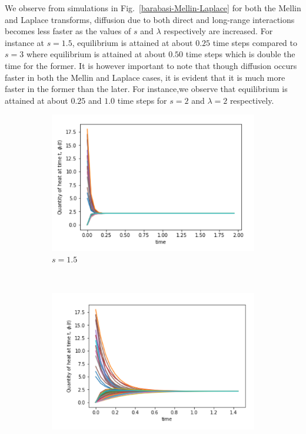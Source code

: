 \documentclass[10pt,a4paper]{article}
\begin{document}
       We observe from simulations in Fig.~\ref{barabasi-Mellin-Laplace} for both the Mellin and Laplace transforms, diffusion due to both direct and long-range interactions becomes less faster as the values of $s$ and $\lambda$ respectively are increased. For instance at $s=1.5$, equilibrium is attained at about $0.25$ time steps compared to $s=3$ where equilibrium is attained at about $0.50$ time steps which is double the time for the former. It is however important to note that though diffusion occurs faster in both the Mellin and Laplace cases, it is evident that it is much more faster in the former than the later. For instance,we observe that equilibrium is attained at about $0.25$ and $1.0$ time steps for $s=2$ and $\lambda=2$ respectively.
        \begin{figure}[H]
        	\centering
        	\begin{subfigure}[b]{0.45\textwidth}
        		\includegraphics[width=\textwidth]{images/Erdos-Mellin15.png}
        		\caption{$s=1.5$}
        	\end{subfigure}~
        	\begin{subfigure}[b]{0.45\textwidth}
        		\includegraphics[width= \textwidth]{images/Erdos-Laplace15.png}

\end{subfigure}
\end{figure}
\end{document}
